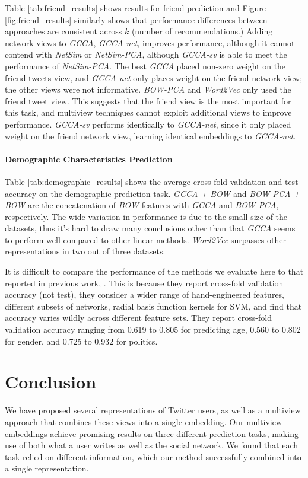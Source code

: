 \documentclass{article}
\newcommand{\gcca}{\emph{GCCA}} %
\newcommand{\gccasv}{\emph{GCCA-sv}} %
\newcommand{\gccaandbow}{\emph{GCCA + BOW}}
\newcommand{\gccawnet}{\emph{GCCA-net}} %
\newcommand{\bow}{\emph{BOW}} %
\newcommand{\bowpca}{\emph{BOW-PCA}} %
\newcommand{\bowpcawnet}{\emph{NetSim-PCA}} %
\newcommand{\bowpcaandbow}{\emph{BOW-PCA + BOW}}
\newcommand{\wordtovec}{\emph{Word2Vec}}
\newcommand{\collab}{\emph{NetSim}} %
\newcommand{\myparagraph}[1]{\vspace{-.2cm}\paragraph{#1}}
\begin{document}
Table \ref{tab:friend_results} shows results for friend prediction and Figure \ref{fig:friend_results} similarly shows that performance differences
between approaches are consistent across $k$ (number of recommendations.)
Adding network views to \gcca, \gccawnet, improves performance, although it cannot contend with \collab{} or \bowpcawnet, although \gccasv{} is able to meet the performance of \bowpcawnet.
The best \gcca{} placed non-zero weight on the friend tweets view, and \gccawnet{} only
places weight on the friend network view; the other views were not
informative.  \bowpca{} and \wordtovec{} only used the friend tweet view.
This suggests that the friend view is the most important for this task, and multiview techniques cannot exploit additional views to improve performance.
\gccasv{} performs identically to \gccawnet, since it only placed weight on the friend network view, learning identical embeddings to \gccawnet.


\myparagraph{Demographic Characteristics Prediction}

Table \ref{tab:demographic_results} shows the average cross-fold validation and
test accuracy on the demographic prediction task.  \gccaandbow{} and \bowpcaandbow{} are the concatenation of \bow{}
features with \gcca{} and \bowpca{}, respectively.  The wide variation in performance is due to the small size of the datasets,
thus it's hard to draw many conclusions other than that \gcca{} seems to perform well compared to other linear methods.
\wordtovec{} surpasses other representations in two out of three datasets.

It is difficult to compare the performance of the methods we evaluate here to that reported in previous work,
\cite{zamal2012}.  This is because they report cross-fold validation accuracy (not test),
they consider a wider range of hand-engineered features, different subsets of networks, radial basis function kernels for SVM, and find
that accuracy varies wildly across different feature sets.  They report cross-fold validation accuracy ranging from 0.619 to 0.805 for
predicting age, 0.560 to 0.802 for gender, and 0.725 to 0.932 for politics.

\section{Conclusion}
\label{discussion}

We have proposed several representations of Twitter users, as well as a multiview approach that combines these views into
a single embedding. Our multiview embeddings achieve promising results on three different prediction tasks, making use of both
what a user writes as well as the social network.  We found that each task relied on different information, which our method 
successfully combined into a single representation.
\end{document}
